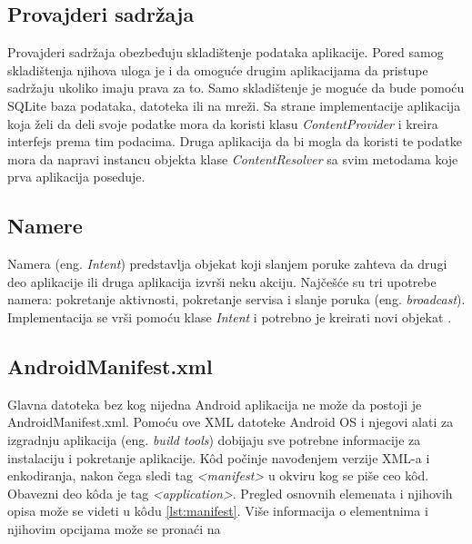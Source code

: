 \documentclass[android.tex]{subfiles}
\begin{document}
\subsection{Provajderi sadržaja}
Provajderi sadržaja obezbeđuju skladištenje podataka aplikacije. Pored samog skladištenja njihova uloga je i da omoguće drugim aplikacijama da pristupe sadržaju ukoliko imaju prava za to. Samo skladištenje je moguće da bude pomoću SQLite baza podataka, datoteka ili na mreži. Sa strane implementacije aplikacija koja želi da deli svoje podatke mora da koristi klasu \textit{ContentProvider} i kreira interfejs prema tim podacima. Druga aplikacija da bi mogla da  koristi te podatke mora da napravi instancu objekta klase \textit{ContentResolver} sa svim metodama koje prva aplikacija poseduje. 

\subsection{Namere}
\label{sec:namere}
Namera (eng. \textit{Intent}) predstavlja objekat koji slanjem poruke zahteva da drugi deo aplikacije ili druga aplikacija izvrši neku akciju. Najčešće su tri upotrebe namera: pokretanje aktivnosti, pokretanje servisa i slanje poruka (eng. \textit{broadcast}). Implementacija se vrši pomoću klase \textit{Intent }i potrebno je kreirati novi objekat \cite{sajt:androidDevelopers}. 

\subsection{AndroidManifest.xml}
\label{sec:manifest}
Glavna datoteka bez kog nijedna Android aplikacija ne može da postoji je AndroidManifest.xml. Pomoću ove XML datoteke  Android OS i njegovi alati za izgradnju aplikacija (eng. \textit{build tools}) dobijaju sve potrebne informacije za instalaciju i pokretanje aplikacije. K\^{o}d počinje navođenjem verzije XML-a i enkodiranja, nakon čega sledi tag \textit{<manifest> }u okviru kog se piše ceo k\^{o}d. Obavezni deo k\^{o}da je tag \textit{<application>}. Pregled osnovnih elemenata i njihovih opisa može se videti u k\^{o}du \ref{lst:manifest}. Više informacija o elementnima i njihovim opcijama može se pronaći na \cite{sajt:manifest}


\end{document}
